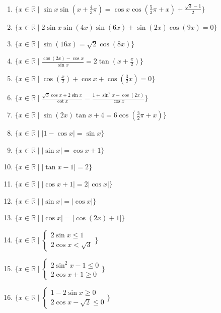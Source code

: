 \documentclass[11pt,a4paper]{article}
\begin{document}
\begin{enumerate}
\item $\displaystyle \{x \in \mathbb{R} \mid \sin x \sin\left(x + \frac{4}{3}\pi\right) = \cos x \cos\left(\frac{5}{3}\pi + x\right) + \frac{\sqrt{3} - 1}{2}\}$
\item $\displaystyle \{x \in \mathbb{R} \mid 2\sin x \sin\left(4x\right)\sin\left(6x\right) + \sin\left(2x\right)\cos\left(9x\right) = 0\}$
\item $\displaystyle \{x \in \mathbb{R} \mid \sin\left(16x\right) = \sqrt{2}\cos\left(8x\right)\}$
\item $\displaystyle \{x \in \mathbb{R} \mid \frac{\cos\left(2x\right) - \cos x}{\sin x} = 2\tan\left(x + \frac{\pi}{2}\right)\}$
\item $\displaystyle \{x \in \mathbb{R} \mid \cos\left(\frac{x}{2}\right) + \cos x + \cos\left(\frac{3}{2}x\right) = 0\}$
\item $\displaystyle \{x \in \mathbb{R} \mid \frac{\sqrt{3}\cos x + 2\sin x}{\cot x} = \frac{1 + \sin^{2} x - \cos\left(2x\right)}{\cos x}\}$
\item $\displaystyle \{x \in \mathbb{R} \mid \sin\left(2x\right)\tan x + 4 = 6\cos\left(\frac{3}{2}\pi + x\right)\}$
\item $\displaystyle \{x \in \mathbb{R} \mid \left|1 - \cos x\right| = \sin x\}$
\item $\displaystyle \{x \in \mathbb{R} \mid \left|\sin x\right| = \cos x + 1\}$
\item $\displaystyle \{x \in \mathbb{R} \mid \left|\tan x - 1\right| = 2\}$
\item $\displaystyle \{x \in \mathbb{R} \mid \left|\cos x + 1\right| = 2\left|\cos x\right|\}$
\item $\displaystyle \{x \in \mathbb{R} \mid \left|\sin x\right| = \left|\cos x\right|\}$
\item $\displaystyle \{x \in \mathbb{R} \mid \left|\cos x\right| = \left|\cos\left(2x\right) + 1\right|\}$
\item $\displaystyle \{x \in \mathbb{R} \mid \begin{cases} 2\sin x \le 1 \\ 2\cos x < \sqrt{3} \end{cases}\}$
\item $\displaystyle \{x \in \mathbb{R} \mid \begin{cases} 2\sin^{2} x - 1 \le 0 \\ 2\cos x + 1 \ge 0 \end{cases}\}$
\item $\displaystyle \{x \in \mathbb{R} \mid \begin{cases} 1 - 2\sin x \ge 0 \\ 2\cos x - \sqrt{2} \le 0 \end{cases}\}$

\end{enumerate}
\end{document}
